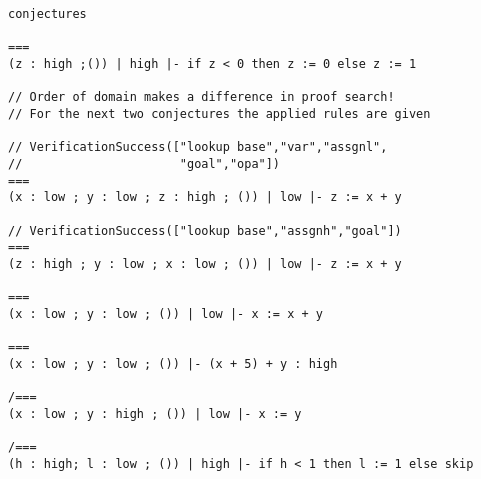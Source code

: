 \begin{lstlisting}[language=sltc]
conjectures

===
(z : high ;()) | high |- if z < 0 then z := 0 else z := 1

// Order of domain makes a difference in proof search!
// For the next two conjectures the applied rules are given

// VerificationSuccess(["lookup base","var","assgnl",
//                      "goal","opa"])
===
(x : low ; y : low ; z : high ; ()) | low |- z := x + y

// VerificationSuccess(["lookup base","assgnh","goal"])
===
(z : high ; y : low ; x : low ; ()) | low |- z := x + y

===
(x : low ; y : low ; ()) | low |- x := x + y

===
(x : low ; y : low ; ()) |- (x + 5) + y : high

/===
(x : low ; y : high ; ()) | low |- x := y

/===
(h : high; l : low ; ()) | high |- if h < 1 then l := 1 else skip
\end{lstlisting}

